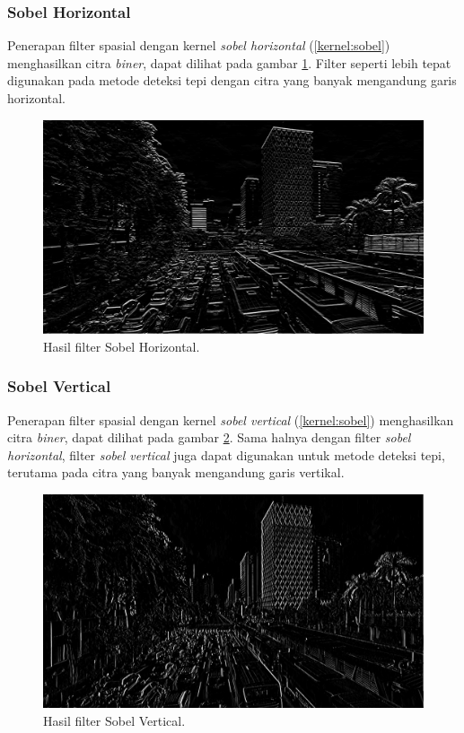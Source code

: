 \subsubsection{Sobel Horizontal}
Penerapan filter spasial dengan kernel \textit{sobel horizontal} (\ref{kernel:sobel}) menghasilkan citra \textit{biner}, dapat dilihat pada gambar \ref{fig:output-sobelhor}. Filter seperti lebih tepat digunakan pada metode deteksi tepi dengan citra yang banyak mengandung garis horizontal.
\begin{figure}
    \includegraphics[width=0.8\linewidth, center]{images/output-image/input1-sobelhor.png}
    \caption{Hasil filter Sobel Horizontal.}
    \label{fig:output-sobelhor}
\end{figure}

\subsubsection{Sobel Vertical}
Penerapan filter spasial dengan kernel \textit{sobel vertical} (\ref{kernel:sobel}) menghasilkan citra \textit{biner}, dapat dilihat pada gambar \ref{fig:output-sobelver}. Sama halnya dengan filter \textit{sobel horizontal}, filter \textit{sobel vertical} juga dapat digunakan untuk metode deteksi tepi, terutama pada citra yang banyak mengandung garis vertikal.
\begin{figure}
    \includegraphics[width=0.8\linewidth, center]{images/output-image/input1-sobelver.png}
    \caption{Hasil filter Sobel Vertical.}
    \label{fig:output-sobelver}
\end{figure}



